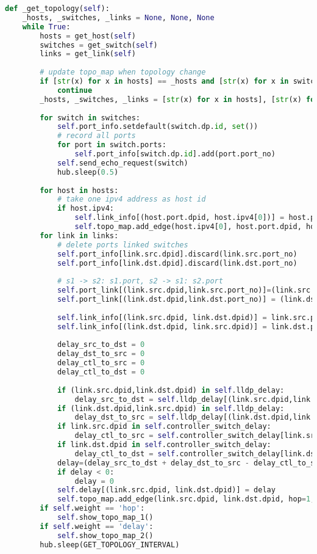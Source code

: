 \documentclass{xjtureport}
\begin{document}
\begin{lstlisting}[language=python]
	def _get_topology(self):
	_hosts, _switches, _links = None, None, None
	while True:
		hosts = get_host(self)
		switches = get_switch(self)
		links = get_link(self)
		
		# update topo_map when topology change
		if [str(x) for x in hosts] == _hosts and [str(x) for x in switches] == _switches and [str(x) for x in links] == _links:
			continue
		_hosts, _switches, _links = [str(x) for x in hosts], [str(x) for x in switches], [str(x) for x in links]
	
		for switch in switches:
			self.port_info.setdefault(switch.dp.id, set())
			# record all ports
			for port in switch.ports:
				self.port_info[switch.dp.id].add(port.port_no)
			self.send_echo_request(switch)
			hub.sleep(0.5)
	
		for host in hosts:
			# take one ipv4 address as host id
			if host.ipv4:
				self.link_info[(host.port.dpid, host.ipv4[0])] = host.port.port_no
				self.topo_map.add_edge(host.ipv4[0], host.port.dpid, hop=1, delay=0, is_host=True)
		for link in links:
			# delete ports linked switches
			self.port_info[link.src.dpid].discard(link.src.port_no)
			self.port_info[link.dst.dpid].discard(link.dst.port_no)
	
			# s1 -> s2: s1.port, s2 -> s1: s2.port
			self.port_link[(link.src.dpid,link.src.port_no)]=(link.src.dpid, link.dst.dpid)
			self.port_link[(link.dst.dpid,link.dst.port_no)] = (link.dst.dpid, link.src.dpid)
	
			self.link_info[(link.src.dpid, link.dst.dpid)] = link.src.port_no
			self.link_info[(link.dst.dpid, link.src.dpid)] = link.dst.port_no
	
			delay_src_to_dst = 0
			delay_dst_to_src = 0
			delay_ctl_to_src = 0
			delay_ctl_to_dst = 0
			
			if (link.src.dpid,link.dst.dpid) in self.lldp_delay:
				delay_src_to_dst = self.lldp_delay[(link.src.dpid,link.dst.dpid)]
			if (link.dst.dpid,link.src.dpid) in self.lldp_delay:
				delay_dst_to_src = self.lldp_delay[(link.dst.dpid,link.src.dpid)]
			if link.src.dpid in self.controller_switch_delay:
				delay_ctl_to_src = self.controller_switch_delay[link.src.dpid]
			if link.dst.dpid in self.controller_switch_delay:
				delay_ctl_to_dst = self.controller_switch_delay[link.dst.dpid]
			delay=(delay_src_to_dst + delay_dst_to_src - delay_ctl_to_src - delay_ctl_to_dst) / 2
			if delay < 0:
				delay = 0
			self.delay[(link.src.dpid, link.dst.dpid)] = delay
			self.topo_map.add_edge(link.src.dpid, link.dst.dpid, hop=1, delay=delay,is_host=False)
		if self.weight == 'hop':
			self.show_topo_map_1()
		if self.weight == 'delay':
			self.show_topo_map_2()
		hub.sleep(GET_TOPOLOGY_INTERVAL)
\end{lstlisting}
\end{document}
